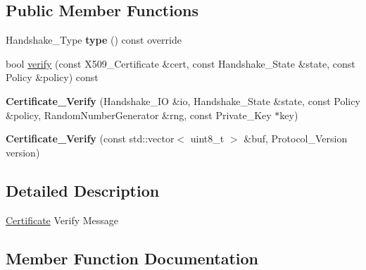 \subsection*{Public Member Functions}
\begin{DoxyCompactItemize}
\item 
\mbox{\label{class_botan_1_1_t_l_s_1_1_certificate___verify_a15a8df0c466894734bc8544b04db7e66}} 
Handshake\+\_\+\+Type {\bfseries type} () const override
\item 
bool \hyperlink{class_botan_1_1_t_l_s_1_1_certificate___verify_ac61de3a15e95ef6803a0fa8542d392e6}{verify} (const X509\+\_\+\+Certificate \&cert, const Handshake\+\_\+\+State \&state, const Policy \&policy) const
\item 
\mbox{\label{class_botan_1_1_t_l_s_1_1_certificate___verify_a022fbdd2fd89b671eeb0dd3ab20b7249}} 
{\bfseries Certificate\+\_\+\+Verify} (Handshake\+\_\+\+IO \&io, Handshake\+\_\+\+State \&state, const Policy \&policy, Random\+Number\+Generator \&rng, const Private\+\_\+\+Key $\ast$key)
\item 
\mbox{\label{class_botan_1_1_t_l_s_1_1_certificate___verify_ae2838535baed1081983fadb99fa9b21e}} 
{\bfseries Certificate\+\_\+\+Verify} (const std\+::vector$<$ uint8\+\_\+t $>$ \&buf, Protocol\+\_\+\+Version version)
\end{DoxyCompactItemize}


\subsection{Detailed Description}
\hyperlink{class_botan_1_1_t_l_s_1_1_certificate}{Certificate} Verify Message 

\subsection{Member Function Documentation}
\mbox{\label{class_botan_1_1_t_l_s_1_1_certificate___verify_ac61de3a15e95ef6803a0fa8542d392e6}} 
